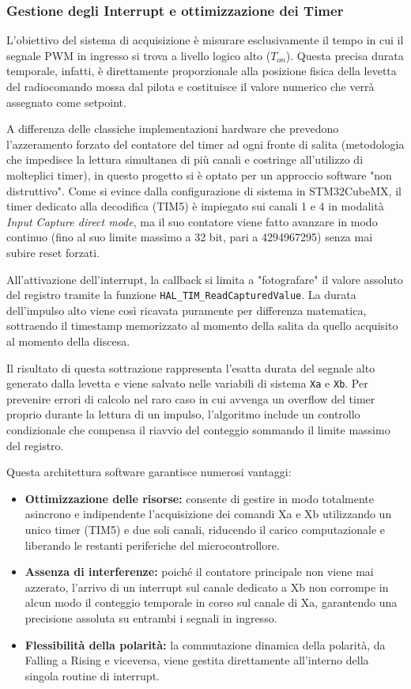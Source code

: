 \documentclass[11pt]{report}
\begin{document}
\subsubsection{Gestione degli Interrupt e ottimizzazione dei Timer}
L'obiettivo del sistema di acquisizione è misurare esclusivamente il tempo in cui il segnale PWM in ingresso si trova a livello logico alto ($T_{on}$). Questa precisa durata temporale, infatti, è direttamente proporzionale alla posizione fisica della levetta del radiocomando mossa dal pilota e costituisce il valore numerico che verrà assegnato come setpoint.

\noindent A differenza delle classiche implementazioni hardware che prevedono l'azzeramento forzato del contatore del timer ad ogni fronte di salita (metodologia che impedisce la lettura simultanea di più canali e costringe all'utilizzo di molteplici timer), in questo progetto si è optato per un approccio software "non distruttivo". Come si evince dalla configurazione di sistema in STM32CubeMX, il timer dedicato alla decodifica (TIM5) è impiegato sui canali 1 e 4 in modalità \textit{Input Capture direct mode}, ma il suo contatore viene fatto avanzare in modo continuo (fino al suo limite massimo a 32 bit, pari a 4294967295) senza mai subire reset forzati. 

\noindent All'attivazione dell'interrupt, la callback si limita a "fotografare" il valore assoluto del registro tramite la funzione \verb|HAL_TIM_ReadCapturedValue|. La durata dell'impulso alto viene così ricavata puramente per differenza matematica, sottraendo il timestamp memorizzato al momento della salita da quello acquisito al momento della discesa. 

\noindent Il risultato di questa sottrazione rappresenta l'esatta durata del segnale alto generato dalla levetta e viene salvato nelle variabili di sistema \verb|Xa| e \verb|Xb|. Per prevenire errori di calcolo nel raro caso in cui avvenga un overflow del timer proprio durante la lettura di un impulso, l'algoritmo include un controllo condizionale che compensa il riavvio del conteggio sommando il limite massimo del registro.

\noindent Questa architettura software garantisce numerosi vantaggi:
\begin{itemize}
    \item \textbf{Ottimizzazione delle risorse:} consente di gestire in modo totalmente asincrono e indipendente l'acquisizione dei comandi Xa e Xb utilizzando un unico timer (TIM5) e due soli canali, riducendo il carico computazionale e liberando le restanti periferiche del microcontrollore.
    \item \textbf{Assenza di interferenze:} poiché il contatore principale non viene mai azzerato, l'arrivo di un interrupt sul canale dedicato a Xb non corrompe in alcun modo il conteggio temporale in corso sul canale di Xa, garantendo una precisione assoluta su entrambi i segnali in ingresso.
    \item \textbf{Flessibilità della polarità:} la commutazione dinamica della polarità, da Falling a Rising e viceversa, viene gestita direttamente all'interno della singola routine di interrupt.
\end{itemize}
\end{document}
